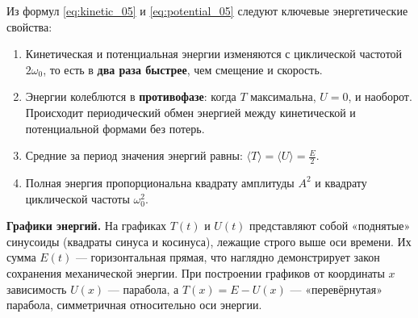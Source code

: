 \begin{property}
Из формул \eqref{eq:kinetic_05} и \eqref{eq:potential_05} следуют ключевые энергетические свойства:
\begin{enumerate}
    \item Кинетическая и потенциальная энергии изменяются с циклической частотой $2\omega_0$, то есть в \textbf{два раза быстрее}, чем смещение и скорость.
    \item Энергии колеблются в \textbf{противофазе}: когда $T$ максимальна, $U=0$, и наоборот. Происходит периодический обмен энергией между кинетической и потенциальной формами без потерь.
    \item Средние за период значения энергий равны: $\langle T \rangle = \langle U \rangle = \frac{E}{2}$.
    \item Полная энергия пропорциональна квадрату амплитуды $A^2$ и квадрату циклической частоты $\omega_0^2$.
\end{enumerate}
\end{property}

\begin{remark}
\textbf{Графики энергий.} На графиках $T(t)$ и $U(t)$ представляют собой «поднятые» синусоиды (квадраты синуса и косинуса), лежащие строго выше оси времени. Их сумма $E(t)$ --- горизонтальная прямая, что наглядно демонстрирует закон сохранения механической энергии. При построении графиков от координаты $x$ зависимость $U(x)$ --- парабола, а $T(x) = E - U(x)$ --- «перевёрнутая» парабола, симметричная относительно оси энергии.
\end{remark}

